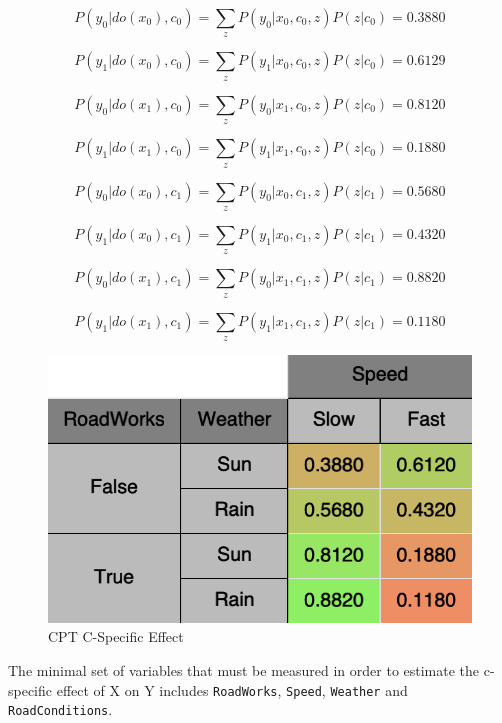 \documentclass[a4paper,12pt]{article} %
\begin{document}
\begin{equation*}
P(y_0|do(x_0), c_0)= \sum_{z} P(y_0|x_0, c_0, z) P(z|c_0)=0.3880
\end{equation*}

\begin{equation*}
P(y_1|do(x_0), c_0)= \sum_{z} P(y_1|x_0, c_0, z) P(z|c_0)=0.6129
\end{equation*}

\begin{equation*}
P(y_0|do(x_1), c_0)= \sum_{z} P(y_0|x_1, c_0, z) P(z|c_0)=0.8120
\end{equation*}

\begin{equation*}
P(y_1|do(x_1), c_0)= \sum_{z} P(y_1|x_1, c_0, z) P(z|c_0)=0.1880
\end{equation*}

\begin{equation*}
P(y_0|do(x_0), c_1)= \sum_{z} P(y_0|x_0, c_1, z) P(z|c_1)=0.5680
\end{equation*}

\begin{equation*}
P(y_1|do(x_0), c_1)= \sum_{z} P(y_1|x_0, c_1, z) P(z|c_1)=0.4320
\end{equation*}

\begin{equation*}
P(y_0|do(x_1), c_1)= \sum_{z} P(y_0|x_1, c_1, z) P(z|c_1)=0.8820
\end{equation*}

\begin{equation*}
P(y_1|do(x_1), c_1)= \sum_{z} P(y_1|x_1, c_1, z) P(z|c_1)=0.1180
\end{equation*}

\begin{figure}[H]
	\centering
	\includegraphics[width=.5\linewidth]{../code/c-specific-effect.png}	
	\caption*{CPT C-Specific Effect}
	\label{fig:c-specific-effect}
\end{figure}
The minimal set of variables that must be measured in order to estimate the c-specific effect of X on Y includes \texttt{RoadWorks}, \texttt{Speed}, \texttt{Weather} and \texttt{RoadConditions}.
\end{document}
